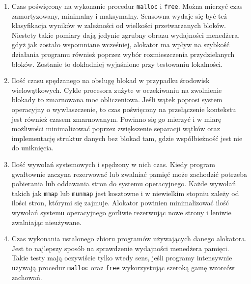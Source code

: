 \documentclass[12pt,a4paper,titlepage,twoside]{mwart}
\begin{document}
\begin{enumerate}

\item Czas poświęcony na wykonanie procedur \texttt{malloc} i \texttt{free}.
Można mierzyć czas zamortyzowany, minimalny i maksymalny. Sensowna wydaje się
być też klasyfikacja wyników w zależności od wielkości przetwarzanych bloków.
Niestety takie pomiary dają jedynie zgrubny obrazu wydajności menedżera, gdyż
jak zostało wspomniane wcześniej, alokator ma wpływ na szybkość działania
programu również poprzez wybór rozmieszczenia przydzielanych bloków. Zostanie
to dokładniej wyjaśnione przy testowaniu lokalności.

\vspace{1ex}

\item Ilość czasu spędzanego na obsługę blokad w przypadku środowisk
wielowątkowych. Cykle procesora zużyte w oczekiwaniu na zwolnienie blokady to
zmarnowana moc obliczeniowa. Jeśli wątek poprosi system operacyjny o
wywłaszczenie, to czas poświęcony na przełączenie kontekstu jest również czasem
zmarnowanym. Powinno się go mierzyć i w miarę możliwości minimalizować poprzez
zwiększenie separacji wątków oraz implementację struktur danych bez blokad tam,
gdzie współbieżność jest nie do uniknięcia.

\vspace{1ex}

\item Ilość wywołań systemowych i spędzony w nich czas. Kiedy program
gwałtownie zaczyna rezerwować lub zwalniać pamięć może zachodzić potrzeba
pobierania lub oddawania stron do systemu operacyjnego. Każde wywołań takich
jak \texttt{mmap} lub \texttt{munmap} jest kosztowne i w niewielkim stopniu
zależy od ilości stron, którymi się zajmuje. Alokator powinien minimalizować
ilość wywołań systemu operacyjnego gorliwie rezerwując nowe strony i leniwie
zwalniając nieużywane.

\vspace{1ex}

\item Czas wykonania ustalonego zbioru programów używających danego alokatora.
Jest to najlepszy sposób na sprawdzenie wydajności menedżera pamięci. Takie
testy mają oczywiście tylko wtedy sens, jeśli programy intensywnie używają
procedur \texttt{malloc} oraz \texttt{free} wykorzystując szeroką gamę wzorców
zachowań.

\end{enumerate}
\end{document}
